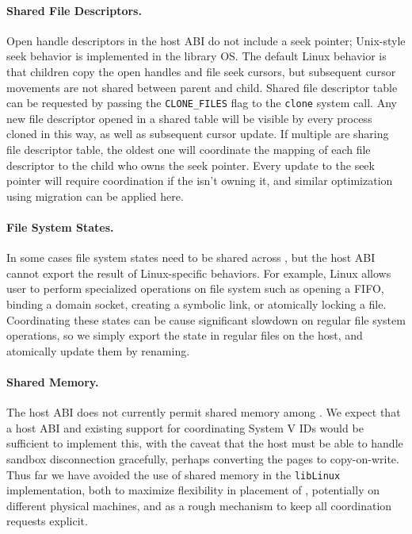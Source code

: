 \paragraph{Shared File Descriptors.} 
Open handle descriptors in the \sysname{} host ABI do not include a seek pointer; 
Unix-style seek behavior is implemented in the library OS.
The default Linux behavior is that children copy the open handles and file seek cursors,
but subsequent cursor movements are not shared between parent and child.
Shared file descriptor table can be requested by passing the {\tt CLONE\_FILES} flag to the {\tt clone} system call.
Any new file descriptor opened in a shared table will be visible by every process cloned in this way, as well as subsequent cursor update.
If multiple \picoprocs{} are sharing file descriptor table,
the oldest one will coordinate the mapping of each file descriptor to the child \picoproc{} who owns the seek pointer.
Every update to the seek pointer will require coordination
if the \picoproc{} isn't owning it,
and similar optimization using migration can be applied here. 

\paragraph{File System States.} 
In some cases file system states need to be shared across \picoprocs{},
but the host ABI cannot export the result of Linux-specific behaviors.
For example, Linux allows user to perform specialized operations on file system
such as opening a FIFO, binding a domain socket, creating a symbolic link,
or atomically locking a file.
Coordinating these states can be cause significant slowdown on regular file system operations, so we simply export the state in regular files on the host,
 and atomically update them by renaming.

\paragraph{Shared Memory.} The \sysname{} host ABI 
does not currently permit shared memory among \picoprocs{}.
We expect that a host ABI and existing support for coordinating System V IDs would be sufficient to implement this,
with the caveat that the host must be able to handle sandbox disconnection gracefully, perhaps converting the pages to copy-on-write.
Thus far we have avoided the use of shared memory in the {\tt libLinux} implementation, both to maximize flexibility in placement of \picoprocs{}, potentially on different physical machines,
and as a rough mechanism to keep all coordination requests explicit.


